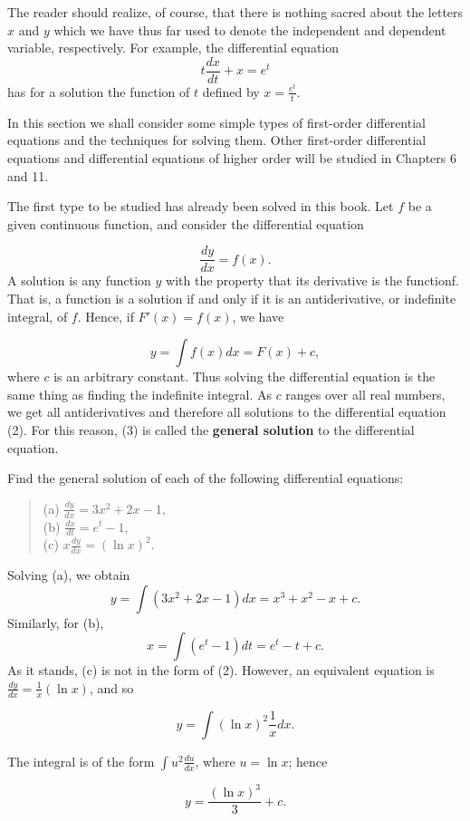 The reader should realize, of course, that there is nothing sacred about the letters $x$ and $y$ which we have thus far used to denote the independent and dependent variable, respectively. For example, the differential equation
$$
t\frac{dx}{dt} + x = e^{t} 
$$
\noindent has for a solution the function of $t$ defined by $x = \frac{e^{t}}{t}$.
\medskip

In this section we shall consider some simple types of first-order differential equations and the techniques for solving them. Other first-order differential equations and differential equations of higher order will be studied in Chapters 6 and 11.

The first type to be studied has already been solved in this book. Let $f$ be a given continuous function, and consider the differential equation

\begin{equation}
\frac{dy}{dx} = f(x).
\label{eq5.5.2}
\end{equation}
\noindent A solution is any function $y$ with the property that its derivative is the functionf. That is, a function is a solution if and only if it is an antiderivative, or indefinite integral, of $f$. Hence, if $F'(x) = f(x)$, we have

\begin{equation}
y = \int f(x) dx = F(x) + c,  
\label{eq5.5.3}
\end{equation}
\noindent where $c$ is an arbitrary constant. Thus solving the differential equation is the same thing as finding the indefinite integral. As $c$ ranges over all real numbers, we get all antiderivatives and therefore all solutions to the differential equation (2). For this reason, (3) is called the \textbf{general solution} to the differential equation.

\begin{example} 
Find the general solution of each of the following differential equations:
 
\begin{quote}
\begin{description}
\item[(a) $\frac{dy}{dx} = 3x^{2} + 2x - 1,$]
\item[(b) $\frac{dx}{dt} = e^{t} - 1,$]
\item[(c) $x \frac{dy}{dx} = (\ln x)^{2}.$]
\end{description}
\end{quote}
\noindent Solving (a), we obtain
$$
y = \int (3x^{2} + 2x - 1) dx = x^{3} + x^{2} - x + c.
$$
Similarly, for (b),
$$
x = \int (e^{t} - 1)dt = e^{t} - t + c.
$$
\noindent As it stands, (c) is not in the form of (2). However, an equivalent equation is 
$\frac{dy}{dx} = \frac{1}{x}(\ln x)$, and so

$$
y = \int (\ln x)^{2} \frac{1}{x} dx.
$$

\noindent The integral is of the form $\int u^{2} \frac{du}{dx}$, where $u = \ln x$; hence  

$$
y = \frac{(\ln x)^3}{3} + c.
$$
\end{example}
\medskip

